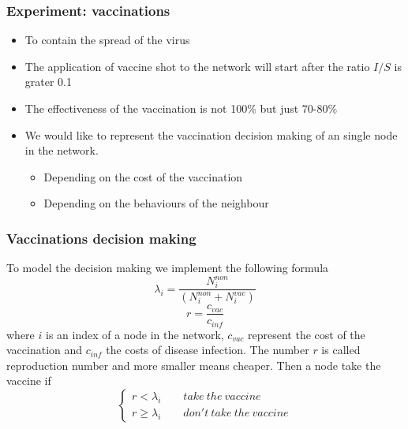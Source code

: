 \documentclass{beamer}
\begin{document}
\begin{frame}
\frametitle{Experiment: vaccinations}
\begin{itemize}
\item To contain the spread of the virus
\item The application of vaccine shot to the network will start after the ratio $I/S$ is grater 0.1
\item The effectiveness of the vaccination is not 100\% but just 70-80\% 
\item We would like to represent the vaccination decision making of an single node in the network.
	\begin{itemize}
	\item Depending on the cost of the vaccination 
	\item Depending on the behaviours of the neighbour
	\end{itemize}
\end{itemize}



\end{frame}


\begin{frame}
\frametitle{Vaccinations decision making}
To model the decision making we implement the following formula
\begin{equation}\label{equa:lamb}
\lambda_i=\frac{N_i^{non}}{( N_i^{non} + N_i^{vac})} \nonumber
\end{equation}      
\begin{equation} \label{equa:r}
r=\frac{c_{vac}}{c_{inf}} \nonumber
\end{equation} 
where $i$ is an index of a node in the network, $c_{vac}$ represent the cost of the vaccination and $c_{inf}$ the costs of disease infection. The number $r$ is called reproduction number and more smaller means cheaper. Then a node take the vaccine if 
\begin{equation}
\begin{cases} 
r< \lambda_i \qquad take \ the \ vaccine \\ r \geq \lambda_i \qquad don't \ take \ the \ vaccine
\end{cases}
\end{equation}
\end{frame}

\end{document}
